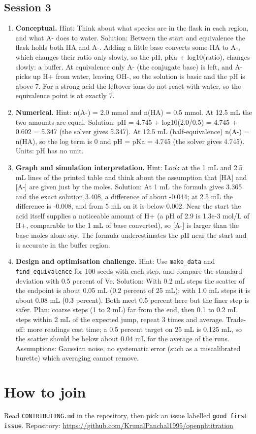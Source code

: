 \documentclass[11pt,a4paper]{article}
\begin{document}
\subsection*{Session 3}
\begin{enumerate}[nosep]
\item \textbf{Conceptual.} Hint: Think about what species are in the flask in each region, and what A- does to water. Solution: Between the start and equivalence the flask holds both HA and A-. Adding a little base converts some HA to A-, which changes their ratio only slowly, so the pH, pKa + log10(ratio), changes slowly: a buffer. At equivalence only A- (the conjugate base) is left, and A- picks up H+ from water, leaving OH-, so the solution is basic and the pH is above 7. For a strong acid the leftover ions do not react with water, so the equivalence point is at exactly 7.
\item \textbf{Numerical.} Hint: n(A-) = 2.0 mmol and n(HA) = 0.5 mmol. At 12.5 mL the two amounts are equal. Solution: pH = 4.745 + log10(2.0/0.5) = 4.745 + 0.602 = 5.347 (the solver gives 5.347). At 12.5 mL (half-equivalence) n(A-) = n(HA), so the log term is 0 and pH = pKa = 4.745 (the solver gives 4.745). Units: pH has no unit.
\item \textbf{Graph and simulation interpretation.} Hint: Look at the 1 mL and 2.5 mL lines of the printed table and think about the assumption that [HA] and [A-] are given just by the moles. Solution: At 1 mL the formula gives 3.365 and the exact solution 3.408, a difference of about -0.044; at 2.5 mL the difference is -0.008, and from 5 mL on it is below 0.002. Near the start the acid itself supplies a noticeable amount of H+ (a pH of 2.9 is 1.3e-3 mol/L of H+, comparable to the 1 mL of base converted), so [A-] is larger than the base moles alone say. The formula underestimates the pH near the start and is accurate in the buffer region.
\item \textbf{Design and optimisation challenge.} Hint: Use \texttt{make\_data} and \texttt{find\_equivalence} for 100 seeds with each step, and compare the standard deviation with 0.5 percent of Ve. Solution: With 0.2 mL steps the scatter of the endpoint is about 0.05 mL (0.2 percent of 25 mL); with 1.0 mL steps it is about 0.08 mL (0.3 percent). Both meet 0.5 percent here but the finer step is safer. Plan: coarse steps (1 to 2 mL) far from the end, then 0.1 to 0.2 mL steps within 2 mL of the expected jump, repeat 3 times and average. Trade-off: more readings cost time; a 0.5 percent target on 25 mL is 0.125 mL, so the scatter should be below about 0.04 mL for the average of the runs. Assumptions: Gaussian noise, no systematic error (such as a miscalibrated burette) which averaging cannot remove.
\end{enumerate}

\section{How to join}
Read \texttt{CONTRIBUTING.md} in the repository, then pick an issue labelled \texttt{good first issue}. Repository: \url{https://github.com/KrunalPanchal1995/openphtitration}
\end{document}
